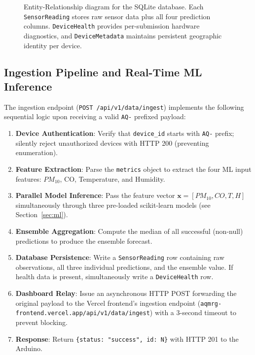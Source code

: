 \documentclass[12pt,a4paper]{article}
\begin{document}
\begin{figure}[H]
\caption{Entity-Relationship diagram for the SQLite database. Each \texttt{SensorReading} stores raw sensor data plus all four prediction columns. \texttt{DeviceHealth} provides per-submission hardware diagnostics, and \texttt{DeviceMetadata} maintains persistent geographic identity per device.}
\label{fig:erd}
\end{figure}

\subsection{Ingestion Pipeline and Real-Time ML Inference}
The ingestion endpoint (\texttt{POST /api/v1/data/ingest}) implements the following sequential logic upon receiving a valid \texttt{AQ-} prefixed payload:

\begin{enumerate}[nosep]
    \item \textbf{Device Authentication}: Verify that \texttt{device\_id} starts with \texttt{AQ-} prefix; silently reject unauthorized devices with HTTP 200 (preventing enumeration).
    \item \textbf{Feature Extraction}: Parse the \texttt{metrics} object to extract the four ML input features: $PM_{10}$, CO, Temperature, and Humidity.
    \item \textbf{Parallel Model Inference}: Pass the feature vector $\mathbf{x} = [PM_{10}, CO, T, H]$ simultaneously through three pre-loaded scikit-learn models (see Section~\ref{sec:ml}).
    \item \textbf{Ensemble Aggregation}: Compute the median of all successful (non-null) predictions to produce the ensemble forecast.
    \item \textbf{Database Persistence}: Write a \texttt{SensorReading} row containing raw observations, all three individual predictions, and the ensemble value. If health data is present, simultaneously write a \texttt{DeviceHealth} row.
    \item \textbf{Dashboard Relay}: Issue an asynchronous HTTP POST forwarding the original payload to the Vercel frontend's ingestion endpoint (\texttt{aqmrg-frontend.vercel.app/api/v1/data/ingest}) with a 3-second timeout to prevent blocking.
    \item \textbf{Response}: Return \texttt{\{status: "success", id: N\}} with HTTP 201 to the Arduino.
\end{enumerate}
\end{document}
